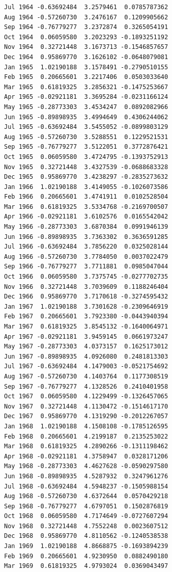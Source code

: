 \documentclass[
  11pt,
  a4paper,
]{report}
\begin{document}
\begin{verbatim}
Jul 1964 -0.63692484  3.2579461  0.0785787362
Aug 1964 -0.57260730  3.2476167  0.1209905662
Sep 1964 -0.76779277  3.2372874  0.3265054191
Oct 1964  0.06059580  3.2023293 -0.1893251192
Nov 1964  0.32721448  3.1673713 -0.1546857657
Dec 1964  0.95869770  3.1626102 -0.0648079081
Jan 1965  1.02190188  3.1578491 -0.2790510155
Feb 1965  0.20665601  3.2217406  0.0503033640
Mar 1965  0.61819325  3.2856321 -0.1475253667
Apr 1965 -0.02921181  3.3695284 -0.0231166124
May 1965 -0.28773303  3.4534247  0.0892082966
Jun 1965 -0.89898935  3.4994649  0.4306244062
Jul 1965 -0.63692484  3.5455052 -0.0899803129
Aug 1965 -0.57260730  3.5288551  0.1229521531
Sep 1965 -0.76779277  3.5122051  0.3772876421
Oct 1965  0.06059580  3.4724795 -0.1393752913
Nov 1965  0.32721448  3.4327539 -0.0688683328
Dec 1965  0.95869770  3.4238297 -0.2835273632
Jan 1966  1.02190188  3.4149055 -0.1026073586
Feb 1966  0.20665601  3.4741911  0.0102528504
Mar 1966  0.61819325  3.5334768 -0.2169700507
Apr 1966 -0.02921181  3.6102576  0.0165542042
May 1966 -0.28773303  3.6870384  0.0991946139
Jun 1966 -0.89898935  3.7363302  0.3636591285
Jul 1966 -0.63692484  3.7856220  0.0325028144
Aug 1966 -0.57260730  3.7784050  0.0037022479
Sep 1966 -0.76779277  3.7711881  0.0985047044
Oct 1966  0.06059580  3.7375745 -0.0277702735
Nov 1966  0.32721448  3.7039609  0.1188246404
Dec 1966  0.95869770  3.7170618 -0.3274595432
Jan 1967  1.02190188  3.7301628 -0.2309646919
Feb 1967  0.20665601  3.7923380 -0.0443940394
Mar 1967  0.61819325  3.8545132 -0.1640064971
Apr 1967 -0.02921181  3.9459145  0.0661973247
May 1967 -0.28773303  4.0373157  0.1625173012
Jun 1967 -0.89898935  4.0926080  0.2481813303
Jul 1967 -0.63692484  4.1479003 -0.0521754692
Aug 1967 -0.57260730  4.1403764  0.1177308519
Sep 1967 -0.76779277  4.1328526  0.2410401958
Oct 1967  0.06059580  4.1229499 -0.1326457065
Nov 1967  0.32721448  4.1130472 -0.1514617170
Dec 1967  0.95869770  4.1319290 -0.2012267057
Jan 1968  1.02190188  4.1508108 -0.1785126595
Feb 1968  0.20665601  4.2199187  0.2135253022
Mar 1968  0.61819325  4.2890266 -0.1311198462
Apr 1968 -0.02921181  4.3758947  0.0328171206
May 1968 -0.28773303  4.4627628 -0.0590297580
Jun 1968 -0.89898935  4.5287932  0.3247961276
Jul 1968 -0.63692484  4.5948237 -0.1505988154
Aug 1968 -0.57260730  4.6372644  0.0570429218
Sep 1968 -0.76779277  4.6797051  0.1502876819
Oct 1968  0.06059580  4.7174649 -0.0727607294
Nov 1968  0.32721448  4.7552248  0.0023607512
Dec 1968  0.95869770  4.8110562 -0.1240538538
Jan 1969  1.02190188  4.8668875 -0.1693894239
Feb 1969  0.20665601  4.9230950  0.0882490180
Mar 1969  0.61819325  4.9793024  0.0369043497

\end{verbatim}
\end{document}
